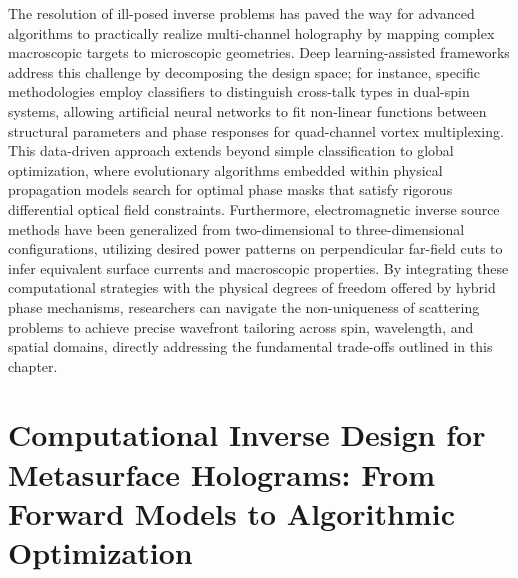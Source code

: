 The resolution of ill-posed inverse problems has paved the way for advanced algorithms to practically realize multi-channel holography by mapping complex macroscopic targets to microscopic geometries. Deep learning-assisted frameworks address this challenge by decomposing the design space; for instance, specific methodologies employ classifiers to distinguish cross-talk types in dual-spin systems, allowing artificial neural networks to fit non-linear functions between structural parameters and phase responses for quad-channel vortex multiplexing. This data-driven approach extends beyond simple classification to global optimization, where evolutionary algorithms embedded within physical propagation models search for optimal phase masks that satisfy rigorous differential optical field constraints. Furthermore, electromagnetic inverse source methods have been generalized from two-dimensional to three-dimensional configurations, utilizing desired power patterns on perpendicular far-field cuts to infer equivalent surface currents and macroscopic properties. By integrating these computational strategies with the physical degrees of freedom offered by hybrid phase mechanisms, researchers can navigate the non-uniqueness of scattering problems to achieve precise wavefront tailoring across spin, wavelength, and spatial domains, directly addressing the fundamental trade-offs outlined in this chapter. \citep{doi_10_1117_1_apn_2_1_016010_57069347} \citep{doi_10_1117_12_3110717_26d5b63b} \citep{doi_10_1109_lawp_2023_3266337_3b44a88a}

\section{Computational Inverse Design for Metasurface Holograms: From Forward Models to Algorithmic Optimization}\label{computational-inverse-design-for-metasurface-holograms-from-forward-models-to-algorithmic-optimization}


